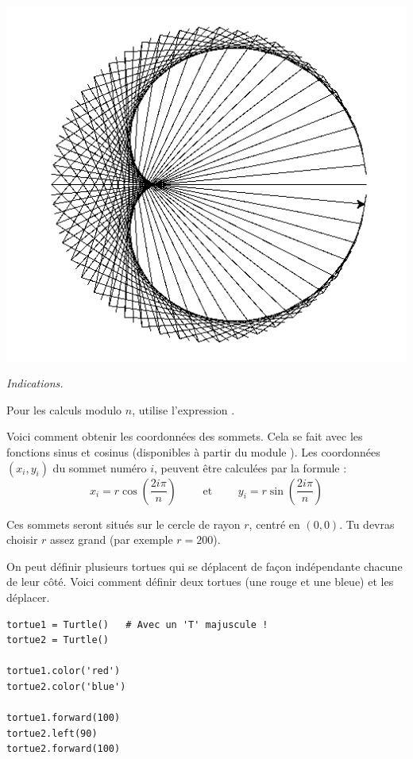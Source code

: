 \documentclass[11pt,class=report,crop=false]{standalone}
\begin{document}
\begin{activite}
\begin{center}
\includegraphics[scale=0.5]{ecran-tortue-5b}
\end{center}

\emph{Indications.}

Pour les calculs modulo $n$, utilise l'expression .


Voici comment obtenir les coordonnées des sommets. Cela se fait avec les fonctions sinus et cosinus (disponibles à partir du module ).
Les coordonnées $(x_i,y_i)$ du sommet numéro $i$, peuvent être calculées par la formule :
$$x_i = r \cos\left(\frac{2 i \pi}{n}\right) \qquad \text{ et } \qquad y_i = r\sin\left(\frac{2 i \pi}{n}\right)$$

Ces sommets seront situés sur le cercle de rayon $r$, centré en $(0,0)$. 
Tu devras choisir $r$ assez grand (par exemple $r=200$).



\end{activite}


\begin{cours}

On peut définir plusieurs tortues qui se déplacent de façon indépendante chacune de leur côté.
Voici comment définir deux tortues (une rouge et une bleue) et les déplacer.

\begin{lstlisting}
tortue1 = Turtle()   # Avec un 'T' majuscule !
tortue2 = Turtle()

tortue1.color('red')
tortue2.color('blue')

tortue1.forward(100)
tortue2.left(90)
tortue2.forward(100)
\end{lstlisting}

\end{cours}
\end{document}
